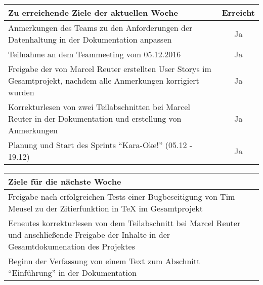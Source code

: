 \begin{tabularx}{\textwidth}{Xc}
    \arrayrulecolor{OliveGreen}
    \toprule
    {\bfseries Zu erreichende Ziele der aktuellen Woche} & {\bfseries Erreicht} \\
    \midrule[2pt]
    Anmerkungen des Teams zu den Anforderungen der Datenhaltung in
    der Dokumentation anpassen  &  Ja  \\
    \rowcolor{OliveGreen!15}
    Teilnahme an dem Teammeeting vom 05.12.2016  &  Ja  \\
    \rowcolor{White}
    Freigabe der von Marcel Reuter erstellten User Storys im
    Gesamtprojekt, nachdem alle Anmerkungen korrigiert wurden  &  Ja  \\
    \rowcolor{OliveGreen!15}
    Korrekturlesen von zwei Teilabschnitten bei Marcel Reuter
    in der Dokumentation und erstellung von Anmerkungen  &  Ja  \\
    \rowcolor{White}
    Planung und Start des Sprints ``Kara-Oke!'' (05.12 \hyp{} 19.12)  &  Ja  \\
    \bottomrule[2pt]
\end{tabularx}
%
\vspace{1cm}
%
\begin{tabularx}{\textwidth}{Xc}
    \arrayrulecolor{OliveGreen}
    \toprule
    {\bfseries Ziele für die nächste Woche}              &                   \\
    \midrule[2pt]
    Freigabe nach erfolgreichen Tests einer Bugbeseitigung von Tim
    Meusel zu der Zitierfunktion in TeX im Gesamtprojekt  &  \\
    \rowcolor{OliveGreen!15}
    Erneutes korrekturlesen von dem Teilabschnitt bei Marcel Reuter und
    anschließende Freigabe der Inhalte in der Gesamtdokumenation
    des Projektes  &  \\
    \rowcolor{White}
    Beginn der Verfassung von einem Text zum Abschnitt ``Einführung'' in der
    Dokumentation  &  \\
\end{tabularx}
